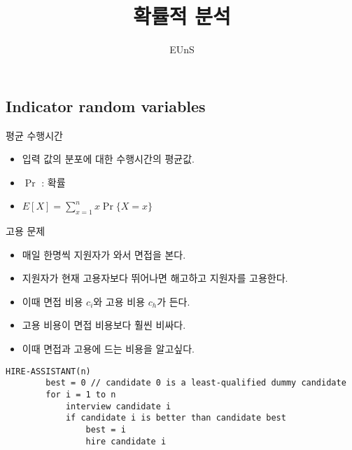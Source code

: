 \documentclass[10pt]{beamer}
\title{확률적 분석}
\author{EUnS}
\begin{document}
\begin{frame}{}
    \maketitle
\end{frame}    



\subsection{Indicator random variables} 

\begin{frame}{평균 수행시간}
    \begin{itemize}
        \item 입력 값의 분포에 대한 수행시간의 평균값.
        \item $\Pr$ : 확률
        \item $\displaystyle E[X] = \sum_{x=1}^n x\Pr\{X=x\}$
    \end{itemize}
\end{frame}

\begin{frame}{고용 문제}
    \begin{itemize}
        \item 매일 한명씩 지원자가 와서 면접을 본다.
        \item 지원자가 현재 고용자보다 뛰어나면 해고하고 지원자를 고용한다.
        \item 이때 면접 비용 $c_i$와 고용 비용 $c_h$가 든다.
        \item 고용 비용이 면접 비용보다 훨씬 비싸다.
        \item 이때 면접과 고용에 드는 비용을 알고싶다.
    \end{itemize}
\end{frame}


\begin{frame}[fragile]{}
    \begin{lstlisting}[style = CppStyle]
    HIRE-ASSISTANT(n)
        best = 0 // candidate 0 is a least-qualified dummy candidate
        for i = 1 to n
            interview candidate i
            if candidate i is better than candidate best
                best = i
                hire candidate i
    \end{lstlisting}
\end{frame}    
\end{document}
